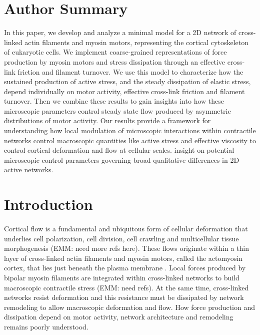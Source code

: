 \documentclass[10pt,letterpaper]{article}
\begin{document}
\section*{Author Summary}
In this paper, we develop and analyze a minimal model for a 2D network of cross-linked actin filaments and myosin motors, representing the cortical cytoskeleton of eukaryotic cells.  We implement coarse-grained representations of force production by myosin motors and stress dissipation through an effective cross-link friction and filament turnover. We use this model to characterize how the sustained production of active stress, and the steady dissipation of elastic stress, depend individually on motor activity,  effective cross-link friction and filament turnover. Then we combine these results to gain insights into how these microscopic parameters control steady state flow produced by asymmetric distributions of motor activity. Our results provide a framework for understanding how local modulation of microscopic interactions within contractile networks control macroscopic quantities like active stress and effective viscosity to control cortical deformation and flow at cellular scales. insight on potential microscopic control parameters governing broad qualitative differences in 2D active networks. 
\linenumbers

\section*{Introduction}

\paragraph{}  Cortical flow is a fundamental and ubiquitous form of cellular deformation that underlies cell polarization, cell division, cell crawling and multicellular tissue morphogenesis\cite{cellmech_flows3,cellmech_flows2} (EMM: need more refs here).  These flows originate within a thin layer of cross-linked actin filaments and myosin motors, called the actomyosin cortex, that lies just beneath the plasma membrane \cite{Salbreux2012536}. Local forces produced by bipolar myosin filaments are integrated within cross-linked networks to build macroscopic contractile stress (EMM: need refs).  At the same time, cross-linked networks resist deformation and this resistance must be dissipated by network remodeling to allow macroscopic deformation and flow.  How force production and dissipation depend on motor activity, network architecture and remodeling remains poorly understood.
\end{document}
